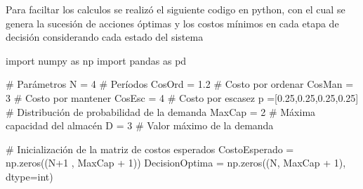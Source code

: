 \documentclass[
  us-letterpaper,
  DIV=11,
  numbers=noendperiod]{scrreprt}
\newenvironment{Shaded}{\begin{snugshade}}{\end{snugshade}}
\newcommand{\BuiltInTok}[1]{\textcolor[rgb]{0.00,0.23,0.31}{#1}}
\newcommand{\CommentTok}[1]{\textcolor[rgb]{0.37,0.37,0.37}{#1}}
\newcommand{\DecValTok}[1]{\textcolor[rgb]{0.68,0.00,0.00}{#1}}
\newcommand{\FloatTok}[1]{\textcolor[rgb]{0.68,0.00,0.00}{#1}}
\newcommand{\ImportTok}[1]{\textcolor[rgb]{0.00,0.46,0.62}{#1}}
\newcommand{\NormalTok}[1]{\textcolor[rgb]{0.00,0.23,0.31}{#1}}
\newcommand{\OperatorTok}[1]{\textcolor[rgb]{0.37,0.37,0.37}{#1}}
\begin{document}
Para faciltar los calculos se realizó el siguiente codigo en python, con
el cual se genera la sucesión de acciones óptimas y los costos mínimos
en cada etapa de decisión considerando cada estado del sistema

\begin{Shaded}
\begin{Highlighting}[]
\ImportTok{import}\NormalTok{ numpy }\ImportTok{as}\NormalTok{ np}
\ImportTok{import}\NormalTok{ pandas }\ImportTok{as}\NormalTok{ pd}

\CommentTok{\# Parámetros}
\NormalTok{N }\OperatorTok{=} \DecValTok{4} \CommentTok{\# Períodos}
\NormalTok{CosOrd }\OperatorTok{=} \FloatTok{1.2}  \CommentTok{\# Costo por ordenar}
\NormalTok{CosMan }\OperatorTok{=} \DecValTok{3}  \CommentTok{\# Costo por mantener}
\NormalTok{CosEsc }\OperatorTok{=} \DecValTok{4}  \CommentTok{\# Costo por escasez}
\NormalTok{p }\OperatorTok{=}\NormalTok{[}\FloatTok{0.25}\NormalTok{,}\FloatTok{0.25}\NormalTok{,}\FloatTok{0.25}\NormalTok{,}\FloatTok{0.25}\NormalTok{] }\CommentTok{\# Distribución de probabilidad de la demanda}
\NormalTok{MaxCap }\OperatorTok{=} \DecValTok{2}  \CommentTok{\# Máxima capacidad del almacén}
\NormalTok{D }\OperatorTok{=} \DecValTok{3}  \CommentTok{\# Valor máximo de la demanda}

\CommentTok{\# Inicialización de la matriz de costos esperados}
\NormalTok{CostoEsperado }\OperatorTok{=}\NormalTok{ np.zeros((N}\OperatorTok{+}\DecValTok{1}\NormalTok{ , MaxCap }\OperatorTok{+} \DecValTok{1}\NormalTok{))}
\NormalTok{DecisionOptima }\OperatorTok{=}\NormalTok{ np.zeros((N, MaxCap }\OperatorTok{+} \DecValTok{1}\NormalTok{), dtype}\OperatorTok{=}\BuiltInTok{int}\NormalTok{)}


\end{Highlighting}
\end{Shaded}
\end{document}
